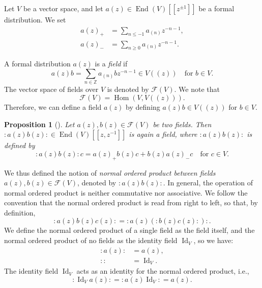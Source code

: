 \documentclass[a4paper, 12pt, reqno]{amsart}
\newtheorem{proposition}[theorem]{Proposition}
\theoremstyle{remark}
\DeclareMathOperator{\Hom}{Hom}
\DeclareMathOperator{\End}{End}
\DeclareMathOperator{\Id}{Id}
\begin{document}
Let $V$ be a vector space, and let $a(z) \in \End(V)[[z^{\pm1}]]$ be a formal distribution.
We set
\begin{align*}
  a(z)_+ &= \sum_{n \le -1}a_{(n)}z^{-n - 1}, \\
  a(z)_- &= \sum_{n \ge 0}a_{(n)}z^{-n - 1}.
\end{align*}

A formal distribution $a(z)$ is a \emph{field} if
\begin{equation*}
  a(z)b = \sum_{n \in \mathbb{Z}}a_{(n)}bz^{-n - 1} \in V((z)) \quad \text{for $b \in V$}.
\end{equation*}
The vector space of fields over $V$ is denoted by $\mathcal{F}(V)$.
We note that
\begin{equation*}
  \mathcal{F}(V) = \Hom(V, V((z))).
\end{equation*}
Therefore, we can define a field $a(z)$ by defining $a(z)b \in V((z))$ for $b \in V$.

\begin{proposition}[{\cite[Proposition 3.3.2]{nozaradan_introduction_2008}}]
  \label{prp:2}
  Let $a(z), b(z) \in \mathcal{F}(V)$ be two fields.
  Then $:a(z)b(z): \in \End(V)[[z,z^{-1}]]$ is again a field, where $:a(z)b(z):$ is defined by
  \begin{equation*}
    :a(z)b(z):c = a(z)_+b(z)c + b(z)a(z)_-c \quad \text{for $c \in V$}.
  \end{equation*}
\end{proposition}

We thus defined the notion of \emph{normal ordered product between fields $a(z), b(z) \in \mathcal{F}(V)$}, denoted by $:a(z)b(z):$.
In general, the operation of normal ordered product is neither commutative nor associative.
We follow the convention that the normal ordered product is read from right to left, so that, by definition,
\begin{equation*}
  :a(z)b(z)c(z): = :a(z)(:b(z)c(z):):.
\end{equation*}
We define the normal ordered product of a single field as the field itself, and the normal ordered product of no fields as the identity field $\Id_V$, so we have:
\begin{align*}
  :a(z): &= a(z), \\
  :: &= \Id_V.
\end{align*}
The identity field $\Id_V$ acts as an identity for the normal ordered product, i.e.,
\begin{equation*}
  :\Id_Va(z): = :a(z)\Id_V: = a(z).
\end{equation*}
\end{document}
